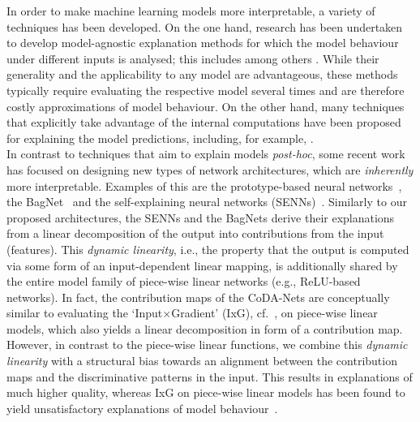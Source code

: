 
In order to make machine learning models more interpretable, a variety of techniques has been developed.
On the one hand, 
    research has been undertaken to develop model-agnostic explanation methods for which the model behaviour
    under different inputs is analysed; this includes among others \cite{lundberg2017unified,petsiuk2018rise,lime}.
    While their generality and the applicability to any model are advantageous,
    these methods typically require evaluating the respective model several times and are therefore costly
    approximations of model behaviour.
On the other hand,
    many techniques that explicitly take advantage of the internal computations have been proposed for explaining
    the model predictions, including, for example, \cite{simonyan2013deep,springenberg2014striving,zhou2016CAM,selvaraju2017grad,shrikumar2017deeplift,sundararajan2017axiomatic,srinivas2019full,bach2015pixel}.\\
In contrast to techniques that aim to explain models \emph{post-hoc},
some recent work has focused on designing new types of network architectures, which are \emph{inherently} more interpretable.
Examples of this are the prototype-based neural networks~\cite{chen2019looks}, the BagNet~\cite{brendel2018approximating}
and the self-explaining neural networks (SENNs)~\cite{melis2018towards}.
Similarly to our proposed architectures,
    the SENNs and the BagNets derive their explanations 
    from a linear decomposition of the output into contributions from the input (features).
This \emph{dynamic linearity}, i.e., the property that the output is computed via some form of an input-dependent linear mapping, is additionally shared by the entire model family of piece-wise linear networks (e.g., ReLU-based networks). In fact, the contribution maps of the CoDA-Nets are conceptually similar to  evaluating the `Input$\times$Gradient' (IxG), cf.~\cite{adebayo2018sanity}, on piece-wise linear models, which also yields a linear decomposition in form of a contribution map.
However, in contrast to the piece-wise linear functions, we combine this \emph{dynamic linearity} with a structural bias towards an alignment between the contribution maps and the discriminative patterns in the input. This results in explanations of much higher quality, whereas IxG on piece-wise linear models has been found to yield unsatisfactory explanations of model behaviour~\cite{adebayo2018sanity}.

